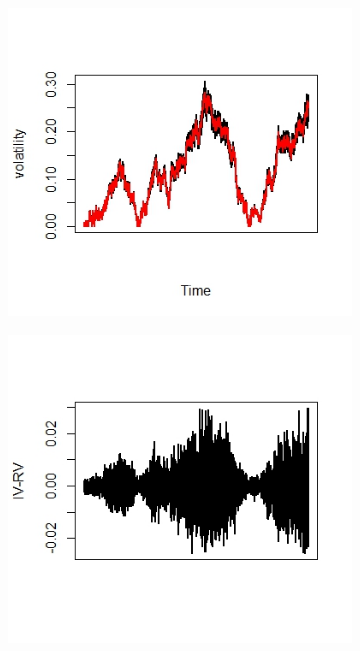 \documentclass{article}
\begin{document}
\begin{figure}[h]
    \centering
    \begin{subfigure}{0.32\textwidth}
        \centering
        \includegraphics[width=\textwidth]{ex5_IVRV1.jpeg}
    \end{subfigure}\hfill
    \begin{subfigure}{0.32\textwidth}
        \centering
        \includegraphics[width=\textwidth]{ex5_IVRV2.jpeg}

\end{subfigure}
\end{figure}
\end{document}
